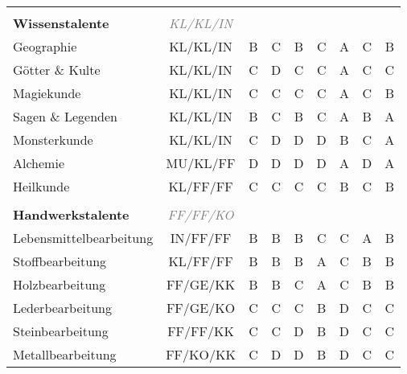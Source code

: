 \begin{center}
\begin{longtable}{|l|c|c|c|c|c|c|c|c|}
\hline
\multicolumn{9}{|l|}{} \\
\multicolumn{1}{|l}{\textbf{Wissenstalente}} & \multicolumn{1}{c}{\textcolor{gray}{\textit{KL/KL/IN}}} & \multicolumn{7}{r|}{} \\
\hline
Geographie & KL/KL/IN & B & C & B & C & A & C & B \\
\hline
Götter \& Kulte & KL/KL/IN & C & D & C & C & A & C & C \\
\hline
Magiekunde\footnotemark[1] & KL/KL/IN & C & C & C & C & A & C & B \\
\hline
Sagen \& Legenden & KL/KL/IN & B & C & B & C & A & B & A \\
\hline
Monsterkunde & KL/KL/IN & C & D & D & D & B & C & A \\
\hline
Alchemie & MU/KL/FF & D & D & D & D & A & D & A \\
\hline
Heilkunde & KL/FF/FF & C & C & C & C & B & C & B \\
 

\hline
\multicolumn{9}{|l|}{} \\
\multicolumn{1}{|l}{\textbf{Handwerkstalente}} & \multicolumn{1}{c}{\textcolor{gray}{\textit{FF/FF/KO}}} & \multicolumn{7}{r|}{} \\
\hline
Lebensmittelbearbeitung & IN/FF/FF & B & B & B & C & C & A & B \\
\hline
Stoffbearbeitung & KL/FF/FF & B & B & B & A & C & B & B \\
\hline
Holzbearbeitung & FF/GE/KK & B & B & C & A & C & B & B \\
\hline
Lederbearbeitung\footnotemark[1] & FF/GE/KO & C & C & C & B & D & C & C \\
\hline
Steinbearbeitung\footnotemark[1] & FF/FF/KK & C & C & D & B & D & C & C \\
\hline
Metallbearbeitung\footnotemark[1] & FF/KO/KK & C & D & D & B & D & C & C \\
 


\end{longtable}
\end{center}
